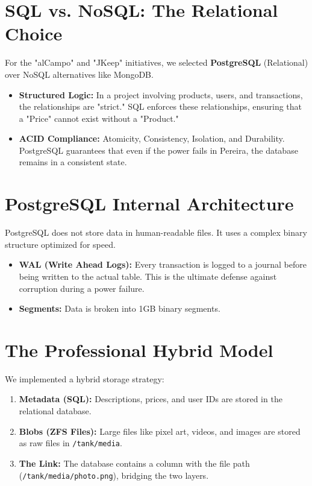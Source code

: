 \documentclass[12pt,a4paper,oneside]{book}
\begin{document}
\section{SQL vs. NoSQL: The Relational Choice}
For the "alCampo" and "JKeep" initiatives, we selected \textbf{PostgreSQL} (Relational) over NoSQL alternatives like MongoDB.
\begin{itemize}
    \item \textbf{Structured Logic:} In a project involving products, users, and transactions, the relationships are "strict." SQL enforces these relationships, ensuring that a "Price" cannot exist without a "Product."
    \item \textbf{ACID Compliance:} Atomicity, Consistency, Isolation, and Durability. PostgreSQL guarantees that even if the power fails in Pereira, the database remains in a consistent state.
\end{itemize}

\section{PostgreSQL Internal Architecture}
PostgreSQL does not store data in human-readable files. It uses a complex binary structure optimized for speed.
\begin{itemize}
    \item \textbf{WAL (Write Ahead Logs):} Every transaction is logged to a journal before being written to the actual table. This is the ultimate defense against corruption during a power failure.
    \item \textbf{Segments:} Data is broken into 1GB binary segments.
\end{itemize}

\section{The Professional Hybrid Model}
We implemented a hybrid storage strategy:
\begin{enumerate}
    \item \textbf{Metadata (SQL):} Descriptions, prices, and user IDs are stored in the relational database.
    \item \textbf{Blobs (ZFS Files):} Large files like pixel art, videos, and images are stored as raw files in \texttt{/tank/media}.
    \item \textbf{The Link:} The database contains a column with the file path (\texttt{/tank/media/photo.png}), bridging the two layers.
\end{enumerate}
\end{document}

